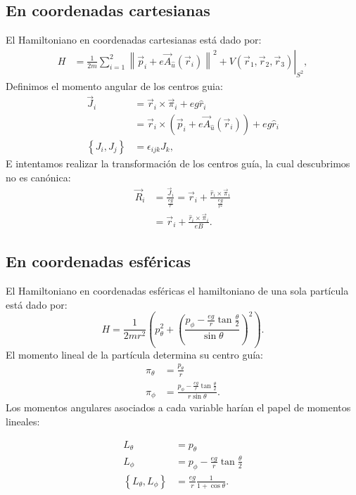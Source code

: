 \documentclass[xcolor=dvipsnames]{beamer}
\newcommand{\norm}[1]{\left\lVert #1 \right\rVert}
\newcommand{\roundP}[1]{\left( #1 \right)}
\newcommand{\poisson}[2]{\left\lbrace #1, #2 \right\rbrace}
\begin{document}
\subsection{En coordenadas cartesianas}
\begin{frame}
El Hamiltoniano en coordenadas cartesianas está dado por:
\begin{align*}
H &= \left. \frac{1}{2m}\sum_{i=1}^2\norm{\vec{p}_i+e\vec{A}_{\hat{u}}(\vec{r}_i)}^2+ V\roundP{\vec{r}_1,\vec{r}_2,\vec{r}_3}    \right|_{S^2},
\end{align*}
Definimos el momento angular de los centros guia:
\begin{align*}
\vec{J}_i &= \vec{r}_i\times\vec{\pi}_i + eg\hat{r}_i\\
&= \vec{r}_i\times\roundP{\vec{p}_i+e\vec{A}_{\hat{u}}(\vec{r}_i)} + eg\hat{r}_i\\
\poisson{J_i}{J_j} &= \epsilon_{ijk}J_k,
\end{align*}
E intentamos realizar la transformación de los centros guía, la cual descubrimos no es canónica:
\begin{align*}
\vec{R}_i &= \frac{\vec{J}_i}{\frac{eg}{r}} = \vec{r}_i + \frac{\hat{r}_i\times\vec{\pi}_i}{\frac{eg}{r^2}} \nonumber\\
&= \vec{r}_i + \frac{\hat{r}_i\times\vec{\pi}_i}{eB}.
\end{align*}
\end{frame}

\subsection{En coordenadas esféricas}
\begin{frame}
El Hamiltoniano en coordenadas esféricas el hamiltoniano de una sola partícula está dado por:
\begin{equation}
H = \frac{1}{2mr^2}\roundP{p_\theta^2 + \roundP{\frac{p_\phi - \frac{eg}{r}\tan{\frac{\theta}{2}}}{\sin\theta}}^2}.
\end{equation}
El momento lineal de la partícula determina su centro guía:
\begin{align*}
\pi_\theta &= \frac{p_\theta}{r}\\
\pi_\phi &= \frac{p_\phi - \frac{eg}{r}\tan{\frac{\theta}{2}}}{r\sin\theta}.
\end{align*}
Los momentos angulares asociados a cada variable harían el papel de momentos lineales:

\begin{align*}
L_\theta &= p_\theta\\
L_\phi &= p_\phi - \frac{eg}{r}\tan{\frac{\theta}{2}}\\
\poisson{L_\theta}{L_\phi} &=  \frac{eg}{r} \frac{1}{1+\cos{\theta}}.
\end{align*}
\end{frame}
\end{document}
